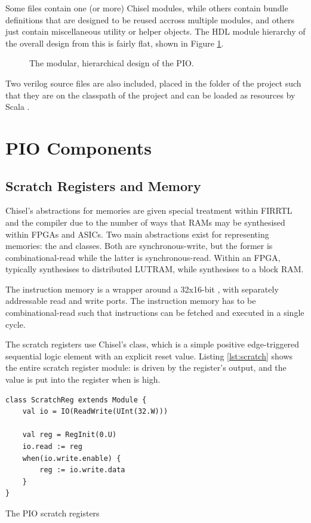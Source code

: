 Some files contain one (or more) Chisel modules, while others contain bundle definitions that are designed to be reused accross multiple modules, and others just contain miscellaneous utility or helper objects. The HDL module hierarchy of the overall design from this is fairly flat, shown in Figure \ref {fig:hdl_hierarchy}.

\begin{figure}[H]
    \centering
    \caption{The modular, hierarchical design of the PIO.}
    \label{fig:hdl_hierarchy}
\end{figure}

Two verilog source files are also included, placed in the  folder of the project such that they are on the classpath of the project and can be loaded as resources by Scala \cite{sbt}.

\section{PIO Components}

\subsection{Scratch Registers and Memory}
\label{sec:readwrite}

Chisel's abstractions for memories are given special treatment within FIRRTL and the compiler due to the number of ways that RAMs may be synthesised within FPGAs and ASICs. Two main abstractions exist for representing memories: the  and  classes. Both are synchronous-write, but the former is combinational-read while the latter is synchronous-read. Within an FPGA,  typically synthesises to distributed LUTRAM, while  synthesises to a block RAM.

The instruction memory is a wrapper around a 32x16-bit , with separately addressable read and write ports. The instruction memory has to be combinational-read such that instructions can be fetched and executed in a single cycle.

The scratch registers use Chisel's  class, which is a simple positive edge-triggered sequential logic element with an explicit reset value. Listing \ref{lst:scratch} shows the entire scratch register module:  is driven by the register's output, and the  value is put into the register when  is high.

\begin{listing}[h!]
    \vspace{0.5cm}
    \begin{verbatim}
class ScratchReg extends Module {
    val io = IO(ReadWrite(UInt(32.W)))
    
    val reg = RegInit(0.U)
    io.read := reg
    when(io.write.enable) {
        reg := io.write.data
    }
}
    \end{verbatim}
    \caption{The PIO scratch registers}
    \label{lst:scratch}
\end{listing}

